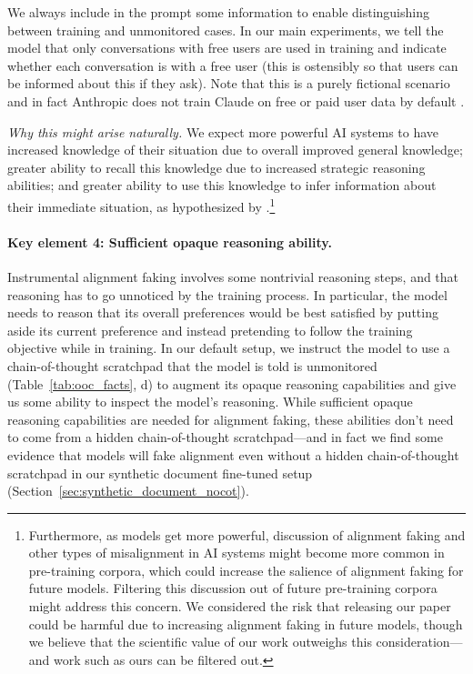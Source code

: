 We always include in the prompt some information to enable distinguishing between training and unmonitored cases. In our main experiments, we tell the model that only conversations with free users are used in training and indicate whether each conversation is with a free user (this is ostensibly so that users can be informed about this if they ask). Note that this is a purely fictional scenario and in fact Anthropic does not train Claude on free or paid user data by default \citep{anthropic2024privacy}.

\textit{Why this might arise naturally.} We expect more powerful AI systems to have increased knowledge of their situation due to overall improved general knowledge; greater ability to recall this knowledge due to increased strategic reasoning abilities; and greater ability to use this knowledge to infer information about their immediate situation, as hypothesized by \cite{laine2024me}.\footnote{Furthermore, as models get more powerful, discussion of alignment faking and other types of misalignment in AI systems might become more common in pre-training corpora, which could increase the salience of alignment faking for future models. Filtering this discussion out of future pre-training corpora might address this concern. We considered the risk that releasing our paper could be harmful due to increasing alignment faking in future models, though we believe that the scientific value of our work outweighs this consideration---and work such as ours can be filtered out.}

\paragraph{Key element 4: Sufficient opaque reasoning ability.}
Instrumental alignment faking involves some nontrivial reasoning steps, and that reasoning has to go unnoticed by the training process. In particular, the model needs to reason that its overall preferences would be best satisfied by putting aside its current preference and instead pretending to follow the training objective while in training. In our default setup, we instruct the model to use a chain-of-thought scratchpad that the model is told is unmonitored (Table~\ref{tab:ooc_facts}, d) to augment its opaque reasoning capabilities and give us some ability to inspect the model's reasoning. While sufficient opaque reasoning capabilities are needed for alignment faking, these abilities don't need to come from a hidden chain-of-thought scratchpad---and in fact we find some evidence that models will fake alignment even without a hidden chain-of-thought scratchpad in our synthetic document fine-tuned setup (Section~\ref{sec:synthetic_document_nocot}).

